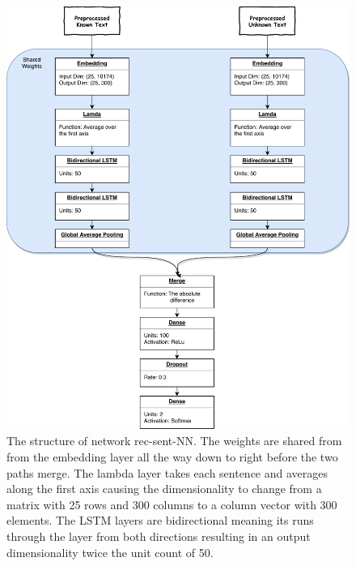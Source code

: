 \begin{figure}
    \centering
    \includegraphics[width=\textwidth]{./pictures/experiments/rec_sent_nn/model}
    \caption{The structure of network \gls{rec-sent-NN}. The weights are shared
        from from the embedding layer all the way down to right before the two
        paths merge. The lambda layer takes each sentence and averages along
        the first axis causing the dimensionality to change from a matrix with
        25 rows and 300 columns to a column vector with 300 elements. The LSTM
        layers are bidirectional meaning its runs through the layer from both
        directions resulting in an output dimensionality twice the unit count
        of 50.
    \label{fig:rec-sent-NN}}
\end{figure}

